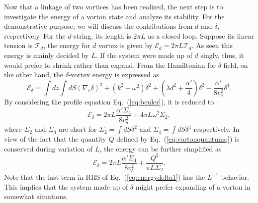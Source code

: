 \documentclass[prd, showpacs,nofootinbib,amsmath,amssymb]{revtex4}
\begin{document}
Now that a linkage of two vortices has been realized, the next step is to investigate the energy of a vorton state
and analyze its stability. For the demonstrative purpose, we will discuss the contributions from $d$ and
$\delta$, respectively. For the $d$-string, its length is $2 \pi L$ as a closed loop.
Suppose its linear tension is $\mathcal{T}_d$, the energy for $d$ vortex is given by
$\mathcal{E}_d = 2\pi L \mathcal{T}_d$. As seen this energy is mainly decided by $L$. 
If the system were made up of $d$ singly, thus, it would prefer to shrink
rather than expand.
From the Hamiltonian for $\delta$ field, on the other hand, the $\delta$-vortex energy is expressed as 
\begin{equation}
  \label{eq:deltah}
  \mathcal{E}_\delta = \int dz \int dS  (\nabla_r \delta)^2 + (k^2 + \omega^2)\delta^2 + (\lambda d^2 + \frac{\alpha'}{4})\delta^2 - \frac{\alpha'}{8v_\delta^2}\delta^4.
\end{equation}
By considering the profile equation Eq.~(\ref{eq:beuler}), it is reduced to
\begin{equation}
  \label{eq:energydelta}
  \mathcal{E}_{\delta} =  2\pi L\frac{\alpha' \Sigma_4}{8v_\delta^2} + 4 \pi L \omega^2 \Sigma_2,
\end{equation}
where $\Sigma_2$ and $\Sigma_4$ are short for
$\Sigma_2 = \int dS \delta^2$ and $\Sigma_4 = \int dS \delta^4$ respectively.
In view of the fact that the quantity $Q$ defined by Eq.~(\ref{eq:vortonquantumq}) is
conserved during variation of $L$, the energy can be further simplified as
\begin{equation}
  \label{eq:energydelta1}
  \mathcal{E}_{\delta} =  2\pi L\frac{\alpha' \Sigma_4}{8v_\delta^2} + \frac{Q^2}{\pi L \Sigma_2}.
\end{equation}
Note that the last term in RHS of Eq.~(\ref{eq:energydelta1}) has the
$L^{-1}$ behavior. 
This implies that the system made up of $\delta$ might prefer expanding of a vorton in somewhat situations.
%
\end{document}
